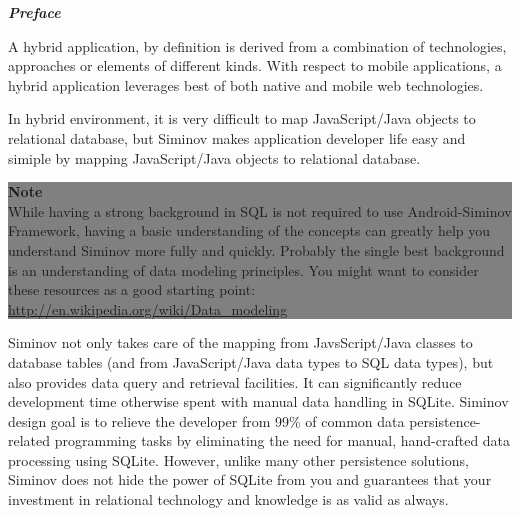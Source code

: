 \newpage
{}
\begin{flushleft}
	\textbf{\emph{\Large{Preface}}}
\end{flushleft}


\small
A hybrid application, by definition is derived from a combination of technologies, approaches or elements of different kinds. With respect to mobile applications, a hybrid application leverages best of both native and mobile web technologies. 

In hybrid environment, it is very difficult to  map JavaScript/Java objects to relational database, but Siminov makes application developer life easy and simiple by mapping JavaScript/Java objects to relational database.



\begin{center}
	\colorbox{grey}{
		\parbox[t]{.8\linewidth}{
			\fontsize{11pt}{11pt}\selectfont %
			\vspace*{0.7cm} %
		
			\hfill \textbf{Note} \\
			\hfill While having a strong background in SQL is not required to use Android-Siminov Framework, having a basic understanding of the concepts can greatly help you understand Siminov more fully and quickly. Probably the single best background is an understanding of data modeling principles. You might want to consider these resources as a good starting point: \url{http://en.wikipedia.org/wiki/Data_modeling}\\
		
			\vspace*{0.7cm} %
		}
}

\end{center}


Siminov not only takes care of the mapping from JavsScript/Java classes to database tables (and from JavaScript/Java data types to SQL data types), but also provides data query and retrieval facilities. It can significantly reduce development time otherwise spent with manual data handling in SQLite. Siminov design goal is to relieve the developer from 99\% of common data persistence-related programming tasks by eliminating the need for manual, hand-crafted data processing using SQLite. However, unlike many other persistence solutions, Siminov does not hide the power of SQLite from you and guarantees that your investment in relational technology and knowledge is as valid as always.

